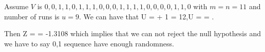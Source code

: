 \begin{example}
Assume $V$ is $0,0,1,1,0,1,1,1,0,0,0,1,1,1,1,0,0,0,0,1,1,0$ with $m=n=11$ and number of runs is $u = 9$. We can have that
\be
\E U =  + 1 = 12,\quad \var U =  = .
\ee

Then
\be
Z =  = -1.3108
\ee
which implies that we can not reject the null hypothesis and we have to say 0,1 sequence have enough randomness.
\end{example}







